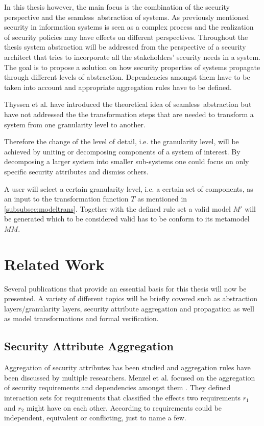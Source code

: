 In this thesis however, the main focus is the combination of the security perspective and the \glqq seamless\grqq \ abstraction of systems. As previously mentioned security in information systems is seen as a complex process \cite{vacca2012computer} and the realization of security policies may have effects on different perspectives. Throughout the thesis system abstraction will be addressed from the perspective of a security architect that tries to incorporate all the stakeholders' security needs in a system. The goal is to propose a solution on how security properties of systems propagate through different levels of abstraction. Dependencies amongst them have to be taken into account and appropriate aggregation rules have to be defined. 

Thyssen et al. have introduced the theoretical idea of \glqq seamless\grqq \ abstraction but have not addressed the the transformation steps that are needed to transform a system from one granularity level to another.  
  
Therefore the change of the level of detail, i.e. the granularity level, will be achieved by uniting or decomposing components of a system of interest. By decomposing a larger system into smaller sub-systems one could focus on only specific security attributes and dismiss others.

A user will select a certain granularity level, i.e. a certain set of components, as an input to the transformation function $T$ as mentioned in \ref{subsubsec:modeltrans}. Together with the defined rule set a valid model $M'$ will be generated which to be considered valid has to be conform to its metamodel $MM$.

\section{Related Work}
\label{sec:related_work}

Several publications that provide an essential basis for this thesis will now be presented. A variety of different topics will be briefly covered such as abstraction layers/granularity layers, security attribute aggregation and propagation as well as model transformations and formal verification. 

\subsection{Security Attribute Aggregation}
\label{subsec:aggregation}
Aggregation of security attributes has been studied and aggregation rules have been discussed by multiple researchers. Menzel et al. focused on the aggregation of security requirements and dependencies amongst them \cite{Menzel2008}. They defined interaction sets for requirements that classified the effects two requirements $r_1$ and $r_2$ might have on each other. According to \cite{Menzel2008} requirements could be independent, equivalent or conflicting, just to name a few.

